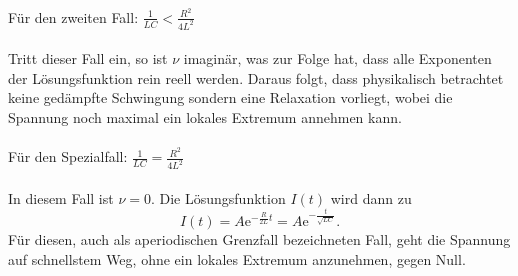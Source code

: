 \documentclass[
  bibliography=totoc,     %
  captions=tableheading,  %
  titlepage=firstiscover, %
]{scrartcl}
\begin{document}
\\
Für den zweiten Fall: $\frac{1}{LC}<\frac{R^2}{4L^2}$ \\
\\
Tritt dieser Fall ein, so ist $\nu$ imaginär, was zur Folge hat, dass alle
Exponenten der Lösungsfunktion rein reell werden. Daraus folgt, dass
physikalisch betrachtet keine gedämpfte Schwingung sondern eine Relaxation
vorliegt, wobei die Spannung noch maximal ein lokales Extremum annehmen kann.\\
\\
Für den Spezialfall: $\frac{1}{LC}=\frac{R^2}{4L^2}$ \\
\\
In diesem Fall ist $\nu=0$. Die Lösungsfunktion $I(t)$ wird dann zu
\begin{equation}
    I(t)=A\mathup{e}^{-\frac{R}{2L}t}=A\mathup{e}^{-\frac{t}{\sqrt{LC}}}.
    \label{eqn:grenzfall}
\end{equation}
Für diesen, auch als aperiodischen Grenzfall bezeichneten Fall, geht die Spannung
auf schnellstem Weg, ohne ein lokales Extremum anzunehmen, gegen Null.
\end{document}
